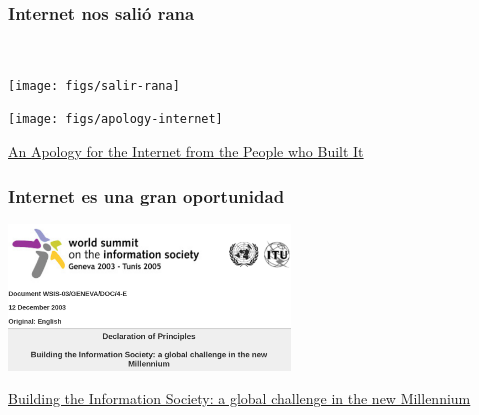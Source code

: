 \documentclass[17pt,aspectratio=169,hyperref=pdfusetitle]{beamer}
\begin{document}
\begin{frame}[fragile]
  \frametitle{Internet nos salió rana}

  ~
  \vspace{2cm}
  \begin{flushright}
  \texttt{[image: figs/salir-rana]}
  \end{flushright}

\end{frame}


\begin{frame}[fragile]

  \begin{center}
  \texttt{[image: figs/apology-internet]}
  \end{center}

  \begin{flushright}
    {\small
      \href{http://nymag.com/selectall/2018/04/an-apology-for-the-internet-from-the-people-who-built-it.html}{An Apology for the Internet from the People who Built It}
    }
  \end{flushright}

\end{frame}


\begin{frame}[fragile]
  \frametitle{Internet es una gran oportunidad}


\end{frame}


\begin{frame}[fragile]

  \begin{center}
  \includegraphics[width=7.5cm]{figs/WSIS-Declaration-Principles}
  \end{center}

  \begin{flushright}
    {\small
      \href{http://www.itu.int/net/wsis/docs/geneva/official/dop.html}{Building the Information Society: a global challenge in the new Millennium}
    }
  \end{flushright}

\end{frame}
\end{document}

